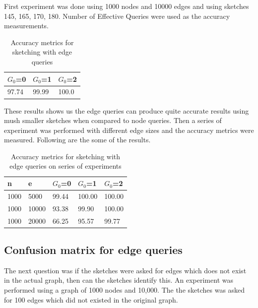 \documentclass[12pt]{report}
\numberwithin{figure}{section}
\numberwithin{table}{section}
\begin{document}
First experiment was done using 1000 nodes and 10000 edges and using sketches 145, 165, 170, 180. Number of Effective Queries were used as the accuracy measurements.

\begin{table}[H]
\centering
\begin{tabular}{|l|l|l|}
\hline
$G_0$=0 & $G_0$=1 & $G_0$=2 \\ \hline
97.74  &   99.99  &   100.0\\ \hline
\end{tabular}
\caption{Accuracy metrics for sketching with edge queries}
\end{table}

These results shows us the edge queries can produce quite accurate results using mush smaller sketches when compared to node queries. Then a series of experiment was performed with different edge sizes and the accuracy metrics were measured. Following are the some of the results.  

\begin{table}[H]
\centering
\begin{tabular}{|l|l|l|l|l|}
\hline
n    & e     & $G_0$=0 & $G_0$=1 & $G_0$=2 \\ \hline
1000 & 5000  & 99.44   & 100.00  & 100.00  \\ \hline
1000 & 10000 & 93.38   & 99.90   & 100.00  \\ \hline
1000 & 20000 & 66.25   & 95.57   & 99.77   \\ \hline
\end{tabular}
\caption{Accuracy metrics for sketching with edge queries on series of experiments}
\end{table}

\subsection{Confusion matrix for edge queries}

The next question was if the sketches were asked for edges which does not exist in the actual graph, then can the sketches identify this. An experiment was performed using a graph of 1000 nodes and 10,000. The the sketches was asked for 100 edges which did not existed in the original graph. 

\paragraph{}
\end{document}
